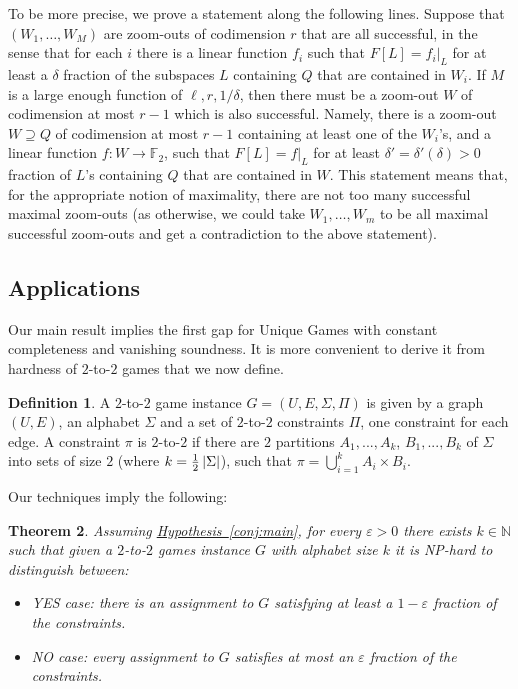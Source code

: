 \documentclass[11pt]{article}
\numberwithin{equation}{section}
\newtheorem{theorem}{Theorem}[section]
\theoremstyle{definition}
\newtheorem{definition}[theorem]{Definition}
\theoremstyle{plain}
\newcommand{\expref}[2]{\hyperref[#2]{#1~\ref{#2}}}
\newcommand\card[1]{\left| {#1} \right|}
\newcommand\half{{1\over2}}
\newcommand\eps{\varepsilon}
\begin{document}
To be more precise, we prove a statement along the following lines.
Suppose that $(W_1,\ldots,W_M)$ are zoom-outs of codimension $r$ that are all successful,
in the sense that for each $i$ there is a linear function $f_i$ such that $F[L] = f_{i}|_{L}$
for at least
a %
$\delta$ fraction of the subspaces $L$ containing $Q$ that are contained in
$W_i$. If $M$ is a large enough function of $\ell, r, 1/\delta$, then there must
be a zoom-out $W$ of codimension at most $r-1$ which is also successful. Namely, there is
a zoom-out $W\supseteq Q$ of codimension at most $r-1$ containing at least one of the $W_i$'s,
and a linear function $f\colon W\to\mathbb{F}_2$,
such that $F[L] = f|_{L}$ for at least $\delta' = \delta'(\delta)>0$ fraction of $L$'s containing
$Q$ that are contained in $W$. This statement means that, for the appropriate notion of maximality,
there are not too many successful maximal zoom-outs (as otherwise, we could take $W_1,\ldots,W_m$ to
be all maximal successful zoom-outs and get a contradiction to the above statement).


\subsection{Applications}

Our main result implies the first gap for Unique Games with constant completeness and vanishing soundness. It is more convenient to
derive it from hardness of $2$-to-$2$ games that we now define.

\begin{definition}
A $2$-to-$2$ game instance $G=(U,E,\Sigma,\Pi)$ is given by a graph $(U,E)$, an alphabet $\Sigma$ and a set of
$2$-to-$2$ constraints $\Pi$, one constraint for each edge. A constraint $\pi$ is $2$-to-$2$ if there are $2$ partitions
$A_1,...,A_k$, $B_1,...,B_k$ of $\Sigma$ into sets of size $2$ (where $k=\half\card{\Sigma}$), such that
$\pi = \bigcup_{i=1}^{k}{A_i\times B_i}$.
\end{definition}

Our techniques imply the following:
\begin{theorem}
Assuming \expref{Hypothesis}{conj:main}, for every $\eps>0$ there exists $k\in\mathbb{N}$ such that given a $2$-to-$2$
games instance $G$ with alphabet size $k$ it is NP-hard to distinguish between:
\begin{itemize}
  \item YES case: there is an assignment to $G$ satisfying at least
  a %
  $1-\eps$ fraction of the constraints.
  \item NO case: every assignment to $G$ satisfies at most
  an %
  $\eps$ fraction of the constraints.
\end{itemize}
\end{theorem}
\end{document}
